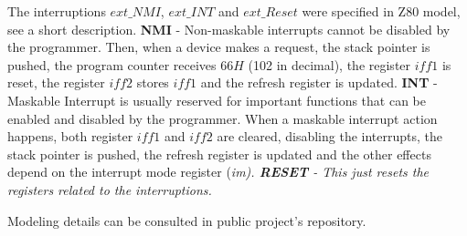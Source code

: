 \documentclass[a4paper]{llncs}
\begin{document}
The interruptions  $ext\_NMI$, $ext\_INT$ and $ext\_Reset$
were specified in Z80 model, see a short description. \textbf{NMI} - Non-maskable interrupts cannot be disabled
 by the programmer. Then, when a device makes a request, the stack pointer is pushed,
the program counter receives $66H$ (102 in decimal), the register $\textit{iff1}$ is reset, the register $\textit{iff2}$ stores
 $\textit{iff1}$ and the refresh register is updated. \textbf{INT} - Maskable Interrupt is usually reserved for important functions
  that can be enabled and disabled by the programmer. When a maskable interrupt
  action happens, both register $\textit{iff1}$ and $\textit{iff2}$ are cleared,
  disabling the interrupts, the stack pointer is pushed, the refresh register is updated and
  the other effects depend on the interrupt mode register (\it im\rm). \textbf{RESET}  - This just resets the registers related to the interruptions.

Modeling details can be consulted in public project's repository.

\end{document}
